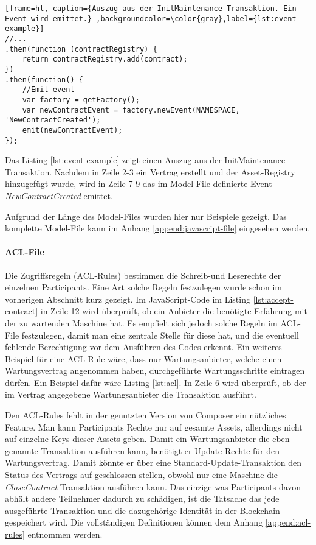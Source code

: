 \begin{lstfloat}
\begin{lstlisting}[frame=hl, caption={Auszug aus der InitMaintenance-Transaktion. Ein Event wird emittet.} ,backgroundcolor=\color{gray},label={lst:event-example}]
//...
.then(function (contractRegistry) {
    return contractRegistry.add(contract);
})
.then(function() {
    //Emit event
    var factory = getFactory();
    var newContractEvent = factory.newEvent(NAMESPACE, 'NewContractCreated');
    emit(newContractEvent);
});
\end{lstlisting} 
\end{lstfloat}

Das Listing \ref{lst:event-example} zeigt einen Auszug aus der InitMaintenance-Transaktion. Nachdem in Zeile 2-3 ein Vertrag erstellt und der Asset-Registry hinzugefügt wurde, wird in Zeile 7-9 das im Model-File definierte Event \textit{NewContractCreated} emittet.

Aufgrund der Länge des Model-Files wurden hier nur Beispiele gezeigt. Das komplette Model-File kann im Anhang \ref{append:javascript-file} eingesehen werden.

\paragraph{ACL-File}
Die Zugriffsregeln (ACL-Rules) bestimmen die Schreib-und Leserechte der einzelnen Participants. Eine Art solche Regeln festzulegen wurde schon im vorherigen Abschnitt kurz gezeigt. Im JavaScript-Code im Listing \ref{lst:accept-contract} in Zeile 12 wird überprüft, ob ein Anbieter die benötigte Erfahrung mit der zu wartenden Maschine hat. Es empfielt sich jedoch solche Regeln im ACL-File festzulegen, damit man eine zentrale Stelle für diese hat, und die eventuell fehlende Berechtigung vor dem Ausführen des Codes erkennt. Ein weiteres Beispiel für eine ACL-Rule wäre, dass nur Wartungsanbieter, welche einen Wartungsvertrag angenommen haben, durchgeführte Wartungsschritte eintragen dürfen. Ein Beispiel dafür wäre Listing \ref{lst:acl}. In Zeile 6 wird überprüft, ob der im Vertrag angegebene Wartungsanbieter die Transaktion ausführt.

Den ACL-Rules fehlt in der genutzten Version von Composer ein nützliches Feature. Man kann Participants Rechte nur auf gesamte Assets, allerdings nicht auf einzelne Keys dieser Assets geben. Damit ein Wartungsanbieter die eben genannte Transaktion ausführen kann, benötigt er Update-Rechte für den Wartungsvertrag. Damit könnte er über eine Standard-Update-Transaktion den Status des Vertrags auf geschlossen stellen, obwohl nur eine Maschine die \textit{CloseContract}-Transaktion ausführen kann. Das einzige was Participants davon abhält andere Teilnehmer dadurch zu schädigen, ist die Tatsache das jede ausgeführte Transaktion und die dazugehörige Identität in der Blockchain gespeichert wird. Die vollständigen Definitionen können dem Anhang \ref{append:acl-rules} entnommen werden.

